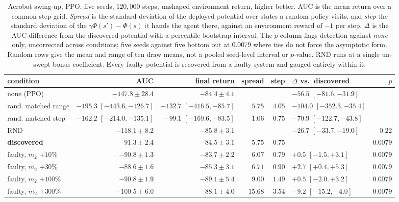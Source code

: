 \documentclass{article}
\begin{document}
\begin{table}[t]
\caption{Acrobot swing-up, PPO, five seeds, $120{,}000$ steps, unshaped
environment return, higher better. AUC is the mean return over a common step
grid. \emph{Spread} is the standard deviation of the deployed potential over
states a random policy visits, and \emph{step} the standard deviation of the
$\gamma\Phi(s') - \Phi(s)$ it hands the agent there, against an environment
reward of $-1$ per step. $\Delta$ is the AUC difference from the discovered
potential with a percentile bootstrap interval. The $p$ column flags detection
against \emph{none} only, uncorrected across conditions; five seeds against five
bottom out at $0.0079$ where ties do not force the asymptotic form. Random rows
give the mean and range of ten draw means, not a pooled seed-level interval or
$p$-value. RND runs at a single un-swept bonus coefficient.
Every faulty potential is recovered from a faulty system and gauged entirely
within it.}
\label{tab:shaping}

\small
\setlength{\tabcolsep}{2.5pt}

\begin{tabularx}{\textwidth}{@{}>{\raggedright\arraybackslash}X
  r r r r >{\raggedright\arraybackslash}X r@{}}
condition & AUC & final return & spread & step & $\Delta$ vs.\ discovered & $p$ \\
\hline
none (PPO)
  & $-147.8 \pm 28.4$
  & $-84.4 \pm 4.1$
  & & & $-56.5$ $[-81.6, -31.9]$
  & \\

rand. matched range
  & $-195.3$ $[-443.6, -126.7]$
  & $-132.7$ $[-416.5, -85.7]$
  & $5.75$ & $4.05$
  & $-104.0$ $[-352.3, -35.4]$
  & \\

rand. matched step
  & $-162.2$ $[-214.0, -135.1]$
  & $-99.1$ $[-169.6, -83.5]$
  & $1.06$ & $0.75$
  & $-70.9$ $[-122.7, -43.8]$
  & \\

RND \citep{burda2019rnd}
  & $-118.1 \pm 8.2$
  & $-85.8 \pm 3.1$
  & & &
  $-26.7$ $[-33.7, -19.0]$
  & $0.22$ \\

\textbf{discovered}
  & $\mathbf{-91.3 \pm 2.4}$
  & $-84.5 \pm 3.1$
  & $5.75$ & $0.75$
  & & $0.0079$ \\

faulty, $m_2$ $+10\%$
  & $-90.8 \pm 1.3$
  & $-83.7 \pm 2.2$
  & $6.07$ & $0.79$
  & $+0.5$ $[-1.5, +3.1]$
  & $0.0079$ \\

faulty, $m_2$ $+30\%$
  & $\mathbf{-88.6 \pm 1.6}$
  & $-85.3 \pm 3.1$
  & $6.71$ & $0.90$
  & $+2.7$ $[+0.4, +5.3]$
  & $0.0079$ \\

faulty, $m_2$ $+100\%$
  & $-90.8 \pm 1.9$
  & $-89.1 \pm 5.4$
  & $9.00$ & $1.49$
  & $+0.5$ $[-2.0, +3.2]$
  & $0.0079$ \\

faulty, $m_2$ $+300\%$
  & $-100.5 \pm 6.0$
  & $-88.1 \pm 4.0$
  & $15.68$ & $3.54$
  & $-9.2$ $[-15.2, -4.0]$
  & $0.0079$ \\
\end{tabularx}
\end{table}
\end{document}
